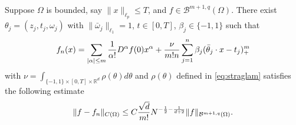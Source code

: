 \begin{lemma}\label{lm:Cstratifypm1}
Suppose $\Omega$ is bounded, say $\|x\|_{\ell_p}\le T$, and $f\in \mathcal B^{m+1, q}(\Omega)$.
There exist $\theta_j=(z_j, t_j, \omega_j)$ with $\|\bar \omega_j\|_{\ell_1}=1$, $t\in [0,T]$,  $\beta_j\in \{-1,1\}$ such that 
$$
f_n(x)= \sum_{|\alpha|\le m}{1\over \alpha!}D^\alpha f(0) x^\alpha + {\nu\over m!n}\sum_{j=1}^{n}\beta_j (\bar \theta_j\cdot x - t_j)_+^m
$$ 
with $\nu=\int_{\{-1,1\}\times [0,T]\times \mathbb{R}^{d}} \rho(\theta)d\theta$ and $\rho(\theta)$  defined in \eqref{eq:straglam} 
satisfies the following estimate
\begin{equation}
\|f - f_n \|_{C(\Omega)} \leq C{\sqrt{d} \over m!}N^{-{1\over 2}-{1\over d+2}}\|f\|_{\mathcal B^{m+1, q}(\Omega)}.
\end{equation}   
\end{lemma}
